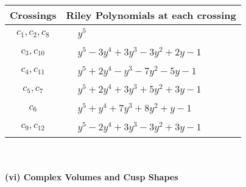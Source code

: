\documentclass[1p]{elsarticle_modified}
\theoremstyle{definition}
\begin{document}
\begin{tabular}{m{50pt}|m{274pt}}
Crossings & \hspace{64pt}Riley Polynomials at each crossing \\
\hline $$\begin{aligned}c_{1},c_{2},c_{8}\end{aligned}$$&$\begin{aligned}
&y^5
\end{aligned}$\\
\hline $$\begin{aligned}c_{3},c_{10}\end{aligned}$$&$\begin{aligned}
&y^5-3 y^4+3 y^3-3 y^2+2 y-1
\end{aligned}$\\
\hline $$\begin{aligned}c_{4},c_{11}\end{aligned}$$&$\begin{aligned}
&y^5+2 y^4- y^3-7 y^2-5 y-1
\end{aligned}$\\
\hline $$\begin{aligned}c_{5},c_{7}\end{aligned}$$&$\begin{aligned}
&y^5+2 y^4+3 y^3+5 y^2+3 y-1
\end{aligned}$\\
\hline $$\begin{aligned}c_{6}\end{aligned}$$&$\begin{aligned}
&y^5+y^4+7 y^3+8 y^2+y-1
\end{aligned}$\\
\hline $$\begin{aligned}c_{9},c_{12}\end{aligned}$$&$\begin{aligned}
&y^5-2 y^4+3 y^3-3 y^2+3 y-1
\end{aligned}$\\
\hline
\end{tabular}\\~\\
\newpage\flushleft \textbf{(vi) Complex Volumes and Cusp Shapes}
\end{document}
